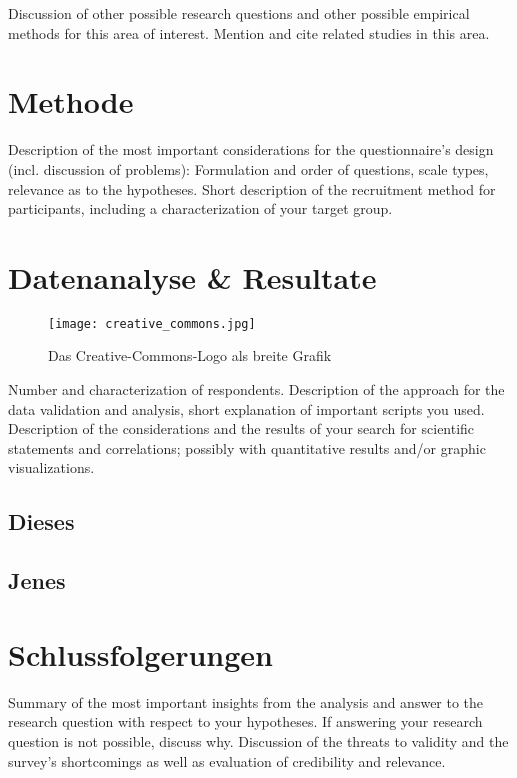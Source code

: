 \documentclass[de]{agse-empir-report}\usepackage[]{graphicx}\usepackage[]{color}
\begin{document}
Discussion of other possible research questions and other possible
empirical methods for this area of interest.
Mention and cite related studies in this area.

\lipsum[3]


\section[hs]{Methode}

Description of the most important considerations for the
questionnaire's design (incl. discussion of problems):
Formulation and order of questions, scale types, relevance as to the
hypotheses.
Short description of the recruitment method for participants,
including a characterization of your target group.

\lipsum[4]


\section[pb]{Datenanalyse \& Resultate}

\begin{figure*}
    \texttt{[image: creative\_commons.jpg]}
    \caption{Das Creative-Commons-Logo als breite Grafik}
\end{figure*}

Number and characterization of respondents.
Description of the approach for the data validation and
analysis, short explanation of important scripts you used.
Description of the considerations and the results of your search for
scientific statements and correlations; possibly with quantitative
results and/or graphic visualizations.

\lipsum[5]


\subsection{Dieses}
\lipsum[6]


\subsection[mds]{Jenes}
\lipsum[7-8]


\section[hs]{Schlussfolgerungen}
Summary of the most important insights from the analysis and
answer to the research question with respect to your hypotheses.
If answering your research question is not possible, discuss why.
Discussion of the threats to validity and the survey's
shortcomings as well as evaluation of credibility and relevance.
\end{document}
